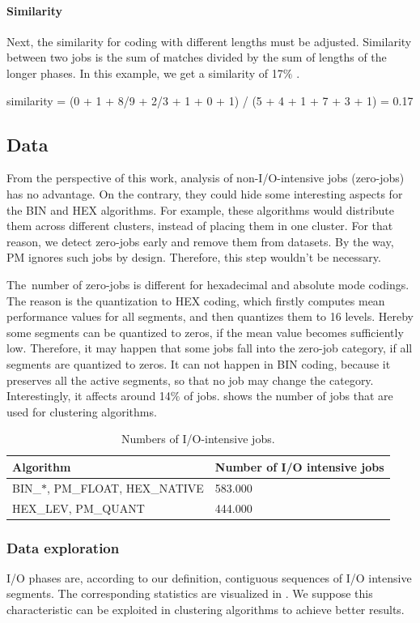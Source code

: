 \documentclass[]{llncs}
\begin{document}
\paragraph{Similarity}
Next, the similarity for coding with different lengths must be adjusted. Similarity between two jobs is the sum of matches divided by the sum of lengths of the longer phases. In this example, we get a similarity of 17$\%$ .

similarity = (0 + 1 + 8/9 + 2/3 + 1 + 0 + 1) / (5 + 4 + 1 + 7 + 3 + 1) = 0.17

\subsection{Data}
From the perspective of this work, analysis of non-I/O-intensive jobs (zero-jobs) has no advantage.
On the contrary, they could hide some interesting aspects for the BIN and HEX algorithms.
For example, these algorithms would distribute them across different clusters, instead of placing them in one cluster.
For that reason, we detect zero-jobs early and remove them from datasets.
By the way, PM ignores such jobs by design.
Therefore, this step wouldn't be necessary.

The\ number of zero-jobs is different for hexadecimal and absolute mode codings.
The reason is the quantization to HEX coding, which firstly computes mean performance values for all segments, and then quantizes them to 16 levels.
Hereby some segments can be quantized to zeros, if the mean value becomes sufficiently low.
Therefore, it may happen that some jobs fall into the zero-job category, if all segments are quantized to zeros.
It can not happen in BIN coding, because it preserves all the active segments, so that no job may change the category.
Interestingly, it affects around 14$\%$  of jobs.
 shows the number of jobs that are used for clustering algorithms.
\begin{table}
  \centering
  \begin{tabular}{ll}
    \hline
    Algorithm & Number of I/O intensive jobs \\
    \hline
    BIN\_$\ast$, PM\_FLOAT, HEX\_NATIVE &  583.000 \\
    HEX\_LEV, PM\_QUANT &  444.000 \\
  \end{tabular}
  \caption{Numbers of I/O-intensive jobs.}
  \label{tab:n_intensive_jobs}
\end{table}

\subsubsection{Data exploration}
I/O phases are, according to our definition, contiguous sequences of I/O intensive segments.
The corresponding statistics are visualized in .
We suppose this characteristic can be exploited in clustering algorithms to achieve better results.
\end{document}
